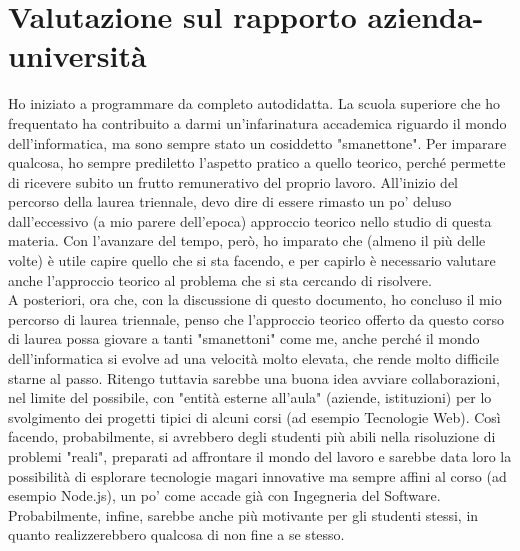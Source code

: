 \section{Valutazione sul rapporto azienda-università}
Ho iniziato a programmare da completo autodidatta. La scuola superiore che ho frequentato ha contribuito a darmi un'infarinatura accademica riguardo il mondo dell'informatica, ma sono sempre stato un cosiddetto "smanettone". Per imparare qualcosa, ho sempre prediletto l'aspetto pratico a quello teorico, perché permette di ricevere subito un frutto remunerativo del proprio lavoro. All'inizio del percorso della laurea triennale, devo dire di essere rimasto un po' deluso dall'eccessivo (a mio parere dell'epoca) approccio teorico nello studio di questa materia. Con l'avanzare del tempo, però, ho imparato che (almeno il più delle volte) è utile capire quello che si sta facendo, e per capirlo è necessario valutare anche l'approccio teorico al problema che si sta cercando di risolvere.\\
A posteriori, ora che, con la discussione di questo documento, ho concluso il mio percorso di laurea triennale, penso che l'approccio teorico offerto da questo corso di laurea possa giovare a tanti "smanettoni" come me, anche perché il mondo dell'informatica si evolve ad una velocità molto elevata, che rende molto difficile starne al passo. Ritengo tuttavia sarebbe una buona idea avviare collaborazioni, nel limite del possibile, con "entità esterne all'aula" (aziende, istituzioni) per lo svolgimento dei progetti tipici di alcuni corsi (ad esempio Tecnologie Web). Così facendo, probabilmente, si avrebbero degli studenti più abili nella risoluzione di problemi "reali", preparati ad affrontare il mondo del lavoro e sarebbe data loro la possibilità di esplorare tecnologie magari innovative ma sempre affini al corso (ad esempio Node.js), un po' come accade già con Ingegneria del Software. Probabilmente, infine, sarebbe anche più motivante per gli studenti stessi, in quanto realizzerebbero qualcosa di non fine a se stesso.